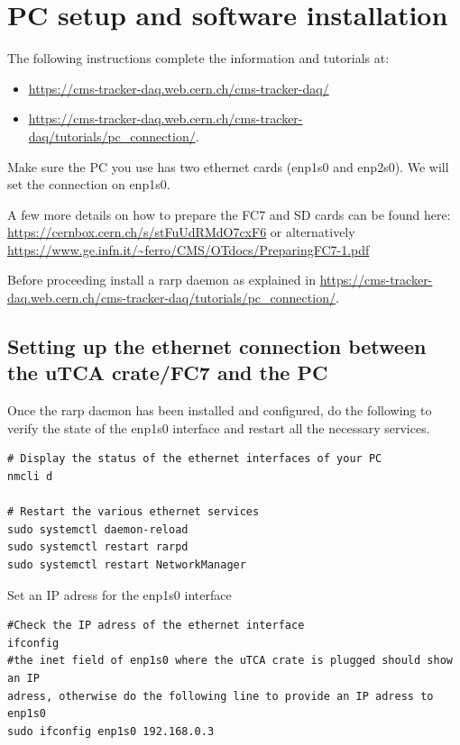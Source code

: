 \documentclass[10pt,a4paper]{article}
\begin{document}
\section{PC setup and software installation}

The following instructions complete the information and tutorials at:
\begin{itemize}
\item \url{https://cms-tracker-daq.web.cern.ch/cms-tracker-daq/} 
\item \url{https://cms-tracker-daq.web.cern.ch/cms-tracker-daq/tutorials/pc_connection/}.
\end{itemize}
Make sure the PC you use has two ethernet cards (enp1s0 and enp2s0). We will set the connection on enp1s0.

A few more details on how to prepare the FC7 and SD cards can be found here:
\url{https://cernbox.cern.ch/s/stFuUdRMdO7cxF6} or alternatively \url{https://www.ge.infn.it/~ferro/CMS/OTdocs/PreparingFC7-1.pdf}

Before proceeding install a rarp daemon as explained in \url{https://cms-tracker-daq.web.cern.ch/cms-tracker-daq/tutorials/pc_connection/}.

\subsection{Setting up the ethernet connection between the uTCA crate/FC7 and the PC} 
\label{fc7connection}
Once the rarp daemon has been installed and configured, do the following to verify the state of the enp1s0 interface and restart all the necessary services.
\begin{framed}
\begin{verbatim}
# Display the status of the ethernet interfaces of your PC
nmcli d 

# Restart the various ethernet services
sudo systemctl daemon-reload
sudo systemctl restart rarpd
sudo systemctl restart NetworkManager
\end{verbatim}
\end{framed}

Set an IP adress for the enp1s0 interface
\begin{framed}
\begin{verbatim}
#Check the IP adress of the ethernet interface
ifconfig 
#the inet field of enp1s0 where the uTCA crate is plugged should show an IP 
adress, otherwise do the following line to provide an IP adress to enp1s0
sudo ifconfig enp1s0 192.168.0.3  
\end{verbatim}
\end{framed}
\end{document}
